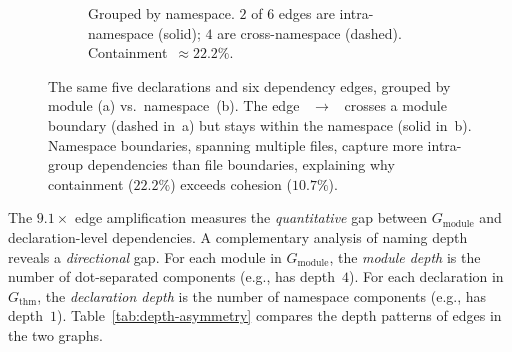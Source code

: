 \begin{figure}[ht]
\begin{subfigure}[b]{0.48\textwidth}
\caption{Grouped by \textcolor{green!50!black}{namespace}. $2$ of $6$ edges are intra-namespace (solid); $4$ are cross-namespace (dashed). Containment~$\approx 22.2\%$.}
\label{fig:ns-vs-mod-namespace-cross}
\end{subfigure}
\caption{The same five declarations and six dependency edges, grouped by module (a) vs.\ namespace~(b). The edge ~$\to$~ crosses a \textcolor{blue!60!black}{module boundary} (dashed in~a) but stays within the \textcolor{green!50!black}{} namespace (solid in~b). Namespace boundaries, spanning multiple files, capture more intra-group dependencies than file boundaries, explaining why containment ($22.2\%$) exceeds cohesion ($10.7\%$).}
\label{fig:ns-vs-mod-cross}
\end{figure}

\label{sec:depth-asymmetry}
\noindent The $9.1\times$ edge amplification measures the \emph{quantitative} gap between $G_{\mathrm{module}}$ and declaration-level dependencies. A complementary analysis of naming depth reveals a \emph{directional} gap. For each module in $G_{\mathrm{module}}$, the \emph{module depth} is the number of dot-separated components (e.g.,  has depth~$4$). For each declaration in $G_{\mathrm{thm}}$, the \emph{declaration depth} is the number of namespace components (e.g.,  has depth~$1$). Table~\ref{tab:depth-asymmetry} compares the depth patterns of edges in the two graphs.

